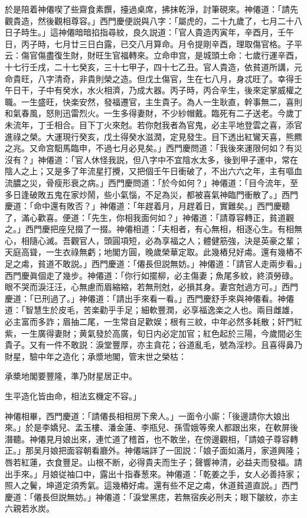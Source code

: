 於是陪着神僊喫了些齋食素饌，擡過桌席，拂抹乾淨，討筆硯來。神僊道：「請先觀貴造，然後觀相尊容。」西門慶便説與八字：「屬虎的，二十九歲了，七月二十八日子時生。」這神僊暗暗掐指尋紋，良久説道：「官人貴造丙寅年，辛酉月，壬午日，丙子時，七月廿三日白露，已交八月算命。月令提剛辛酉，理取傷官格。子平云：傷官傷盡復生財，財旺生官福轉來。立命申宫，是城頭土命：七歲行運辛酉，十七行壬戌，二十七癸亥，三十七甲子，四十七乙丑。官人貴造，依貧道所講，元命貴旺，八字清奇，非貴則榮之造。但戊土傷官，生在七八月，身忒旺了。幸得壬午日干，子中有癸水，水火相濟，乃成大器。丙子時，丙合辛生，後來定掌威權之職。一生盛旺，快楽安然，發福遷官，主生貴子。為人一生耿直，幹事無二，喜則和氣春風，怒則迅雷烈火。一生多得妻財，不少紗帽戴。臨死有二子送老。今歲丁未流年，丁壬相合。目下丁火來尅。若你尅我者為官鬼，必主平地登雲之喜，添官進祿之榮。大運現行癸亥，戊土得癸水滋潤，定見發生。目下透出紅鸞天喜，熊羆之兆。又命宫馹馬臨申，不過七月必見矣。」西門慶問道：「我後來運限何如？有災沒有？」神僊道：「官人休怪我説，但八字中不宜陰水太多，後到甲子運中，常在陰人之上；又是多了年流星打攪，又把個壬午日衝破了，不出六六之年，主有嘔血流膿之災，骨瘦形衰之病。」西門慶問道：「於今如何？」神僊道：「目今流年，至多日逢破敗五鬼在家炒鬧，些小氣惱，不足為災，都被喜氣神臨門衝散了。」西門慶道：「命中還有敗否？」神僊道：「年趕着月，月趕着日，實難矣。」西門慶聽了，滿心歡喜。便道：「先生，你相我面何如？」神僊道：「請尊容轉正，貧道觀之。」西門慶把座兒掇了一掇。神僊相道：「夫相者，有心無相，相逐心生。有相無心，相隨心滅。吾觀官人，頭圓項短，必為享福之人；體健筋強，決是英豪之輩；天庭高聳，一生衣祿無虧；地閣方圓，晚歲榮華定取。此幾樁兒好䖏。還有幾樁不足之䖏，貧道不敢説。」西門慶道：「僊長但説無妨。」神僊道：「請官人走兩步看。」西門慶眞個走了幾步。神僊道：「你行如擺柳，必主傷妻；魚尾多紋，終湏勞碌。眼不哭而淚汪汪，心無慮而眉縮縮，若無刑尅，必損其身。妻宫尅過方可。」西門慶道：「已刑過了。」神僊道：「請出手來看一看。」西門慶舒手來與神僊看。神僊道：「智慧生於皮毛，苦楽勸乎手足；細軟豐潤，必享福逸楽之人也。兩目雌雄，必主富而多詐；眉抽二尾，一生常自足歡娱；根有三紋，中年必然多耗散；奸門紅紫，一生廣得妻財；黄氣發於高廣，旬日内必定加官；紅色起於三陽，今歲間必生貴子。又有一件不敢説：淚堂豐厚，亦主貪花；谷道亂毛，號為淫杪。且喜得鼻乃財星，驗中年之造化；承漿地閣，管末世之榮枯：

承槳地閣要豐隆，準乃財星居正中。

生平造化皆由命，相法玄機定不容。」

神僊相畢，西門慶道：「請僊長相相房下衆人。」一面令小廝：「後邊請你大娘出來。」於是李嬌兒、孟玉樓、潘金蓮、李瓶兒、孫雪娥等衆人都跟出來，在軟屏後潛聽。神僊見月娘出來，連忙道了稽首，也不敢坐，在傍邊觀相，「請娘子尊容轉正。」那吴月娘把面容朝看廳外。神僊端詳了一囬説：「娘子面如滿月，家道興隆；唇若紅蓮，衣食豐足。山根不断，必得貴夫而生子；聲響神清，必益夫而發福。請出手來。」月娘従袖口中，露出十指春葱來。神僊道：「乾姜之手，女人必善持家；照人之鬢，坤道定須秀氣。這幾樁好䖏。還有些不足之䖏，休道貧道直説。」西門慶道：「僊長但説無妨。」神僊道：「淚堂黑痣，若無宿疾必刑夫；眼下皺紋，亦主六親若氷炭。

